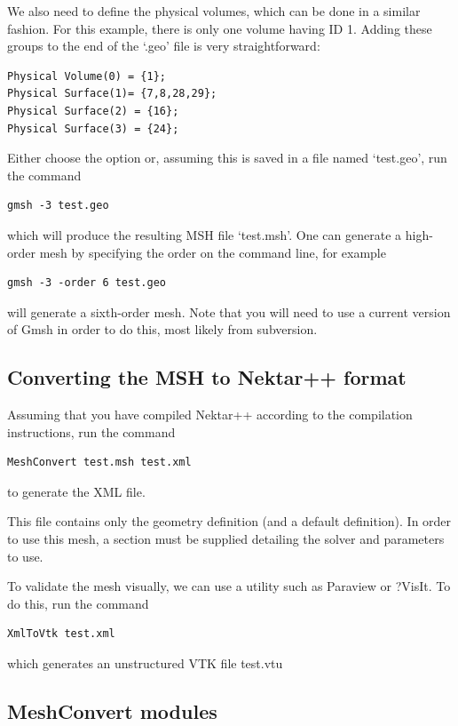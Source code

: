 We also need to define the physical volumes, which can be done in a similar fashion. For this example, there is only one volume having ID 1. Adding these groups to the end of the `.geo' file is very straightforward:

\begin{lstlisting}[style=XmlStyle] 
Physical Volume(0) = {1}; 
Physical Surface(1)= {7,8,28,29}; 
Physical Surface(2) = {16}; 
Physical Surface(3) = {24};
\end{lstlisting}
Either choose the option  or, assuming this is saved in
a file named `test.geo', run the command 
\begin{lstlisting}[style=BashInputStyle]
gmsh -3 test.geo
\end{lstlisting}
which will produce the resulting MSH file `test.msh'. One can generate a
high-order mesh by specifying the order on the command line, for example
\begin{lstlisting}[style=BashInputStyle] 
gmsh -3 -order 6 test.geo
\end{lstlisting}
will generate a sixth-order mesh. Note that you will need to use a current
version of Gmsh in order to do this, most likely from subversion.


\subsection{Converting the MSH to Nektar++ format}
Assuming that you have compiled Nektar++ according to the compilation instructions, run the command
\begin{lstlisting}[style=BashInputStyle]
MeshConvert test.msh test.xml
\end{lstlisting}
to generate the XML file. 

\begin{notebox}
This file contains only the geometry definition (and a default
 definition). In order to use this mesh, a 
section must be supplied detailing the solver and parameters to use.
\end{notebox}

To validate the mesh visually, we can use a utility such as Paraview or ?VisIt. To do this, run the command
\begin{lstlisting}[style=BashInputStyle]
XmlToVtk test.xml
\end{lstlisting}
which generates an unstructured VTK file test.vtu


\subsection{MeshConvert modules}

